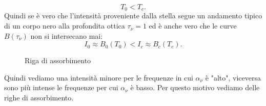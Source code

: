 \[
	T_{0} < T_{c}
.\] 
Quindi se è vero che l'intensità proveniente dalla stella segue un andamento tipico di un corpo nero alla profondita ottica $\tau_{\nu} = 1$ ed è anche vero che le curve $B( \tau _{\nu} ) $ non si intersecano mai: 
\[
	I_{0} \approx B_{0}( T_{0}) <  I_{c} \approx B_{c}( T_{c}) 
.\] 
\begin{figure}[H]
    \centering
    \caption{\scriptsize Riga di assorbimento}
    \label{fig:riga-di-assorbimento}
\end{figure}
\noindent
Quindi vediamo una intensità minore per le frequenze in cui $\alpha _{\nu} $ è "alto", viceversa sono più intense le frequenze per cui $\alpha _{\nu} $ è basso. Per questo motivo vediamo delle righe di assorbimento.
